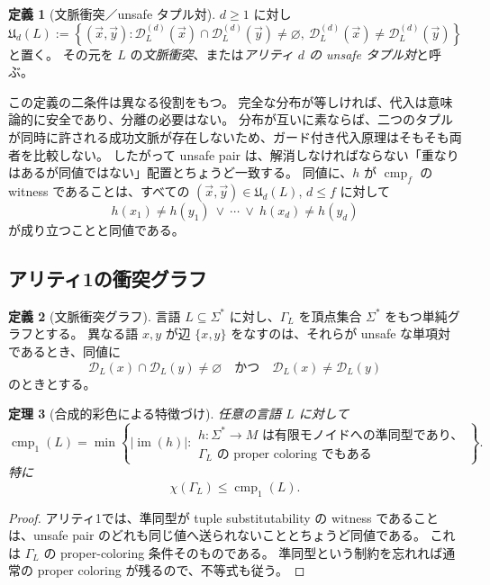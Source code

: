 \documentclass[10pt,a4paper]{ltjsarticle}
\newtheorem{theorem}{定理}[section]
\theoremstyle{definition}
\newtheorem{definition}[theorem]{定義}
\theoremstyle{remark}
\newcommand{\cmp}{\operatorname{cmp}}
\newcommand{\D}{\mathcal D}
\begin{document}
\begin{definition}[文脈衝突／unsafe タプル対]
$d\ge1$ に対し
\[
\mathfrak U_d(L)
:=\left\{(\vec x,\vec y):
\D_L^{(d)}(\vec x)\cap\D_L^{(d)}(\vec y)\neq\varnothing,
\ \D_L^{(d)}(\vec x)\neq\D_L^{(d)}(\vec y)
\right\}
\]
と置く。
その元を $L$ の\emph{文脈衝突}、または\emph{アリティ $d$ の unsafe タプル対}と呼ぶ。
\end{definition}

この定義の二条件は異なる役割をもつ。
完全な分布が等しければ、代入は意味論的に安全であり、分離の必要はない。
分布が互いに素ならば、二つのタプルが同時に許される成功文脈が存在しないため、ガード付き代入原理はそもそも両者を比較しない。
したがって unsafe pair は、解消しなければならない「重なりはあるが同値ではない」配置とちょうど一致する。
同値に、$h$ が $\cmp_f$ の witness であることは、すべての
$(\vec x,\vec y)\in\mathfrak U_d(L)$, $d\le f$ に対して
\[
h(x_1)\neq h(y_1)
\ \vee\ \cdots\ \vee\
h(x_d)\neq h(y_d)
\]
が成り立つことと同値である。

\subsection{アリティ1の衝突グラフ}

\begin{definition}[文脈衝突グラフ]
言語 $L\subseteq\Sigma^*$ に対し、$\Gamma_L$ を頂点集合 $\Sigma^*$ をもつ単純グラフとする。
異なる語 $x,y$ が辺 $\{x,y\}$ をなすのは、それらが unsafe な単項対であるとき、同値に
\[
\D_L(x)\cap\D_L(y)\neq\varnothing
\quad\text{かつ}\quad
\D_L(x)\neq\D_L(y)
\]
のときとする。
\end{definition}

\begin{theorem}[合成的彩色による特徴づけ]
\label{conf:thm:coloring}
任意の言語 $L$ に対して
\[
\cmp_1(L)
=
\min\left\{
|\operatorname{im}(h)|:
\begin{array}{l}
h:\Sigma^*\to M\text{ は有限モノイドへの準同型であり、}\\
\Gamma_L\text{ の proper coloring でもある}
\end{array}
\right\}.
\]
特に
\[
\chi(\Gamma_L)\le\cmp_1(L).
\]
\end{theorem}

\begin{proof}
アリティ1では、準同型が tuple substitutability の witness であることは、unsafe pair のどれも同じ値へ送られないこととちょうど同値である。
これは $\Gamma_L$ の proper-coloring 条件そのものである。
準同型という制約を忘れれば通常の proper coloring が残るので、不等式も従う。
\end{proof}
\end{document}
